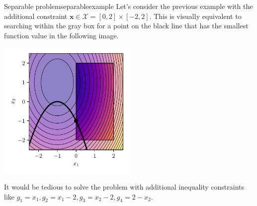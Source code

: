 \begin{example}{Separable problem}{separableexample}
    Let's consider the previous example with the additional constraint $\mathbf{x} \in \mathcal{X} = [0, 2]\times[-2, 2]$.
    This is visually equivalent to searching within the gray box for a point on the black line that has the smallest function value in the following image.
    \begin{center}
        \includegraphics[width=0.5\textwidth]{figures/separable_example.pdf}
    \end{center}

    It would be tedious to solve the problem with additional inequality constraints like $g_1= x_1, g_2=x_1-2, g_3=x_2-2, g_4=2-x_2$. 


\end{example}
